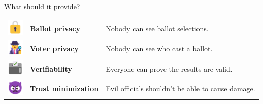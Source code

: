 \documentclass[aspectratio=169]{beamer}
\begin{document}
\begin{frame}{What should it provide?}
    \begin{table}
        \centering
        \begin{tabular}{>{\arraybackslash}m{40px} >{\arraybackslash}m{100px} >{\arraybackslash}m{220px}}
            \includegraphics[width=30px]{images/lock.png} & \textbf{Ballot privacy} & Nobody can see ballot selections. \\
            \includegraphics[width=30px]{images/detective.png} & \textbf{Voter privacy} & Nobody can see who cast a ballot. \\
            \includegraphics[width=30px]{images/ballot.png} & \textbf{Verifiability} & Everyone can prove the results are valid. \\
            \includegraphics[width=30px]{images/evil.png} & \textbf{Trust minimization} & Evil officials shouldn't be able to cause damage. \\
        \end{tabular}
    \end{table}
\end{frame}
\end{document}
